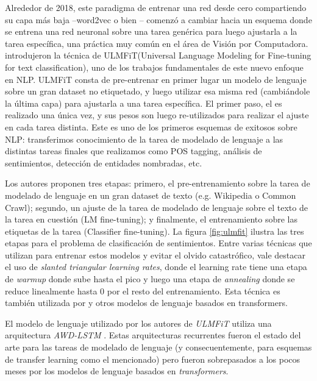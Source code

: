 Alrededor de 2018, este paradigma de entrenar una red desde cero compartiendo su capa más baja --word2vec o bien \elmo{}-- comenzó a cambiar hacia un esquema donde se entrena una red neuronal sobre una tarea genérica para luego ajustarla a la tarea específica, una práctica muy común en el área de Visión por Computadora. \citet{howard-ruder-2018-universal} introdujeron la técnica de ULMFiT(Universal Language Modeling for Fine-tuning for text classification), uno de los trabajos fundamentales de este nuevo enfoque en NLP. ULMFiT consta de pre-entrenar en primer lugar un modelo de lenguaje sobre un gran dataset no etiquetado, y luego utilizar esa misma red (cambiándole la última capa) para ajustarla a una tarea específica. El primer paso, el  es realizado una única vez, y sus pesos son luego re-utilizados para realizar el ajuste en cada tarea distinta. Este es uno de los primeros esquemas de  exitosos sobre NLP: transferimos conocimiento de la tarea de modelado de lenguaje a las distintas tareas finales que realizamos como POS tagging, análisis de sentimientos, detección de entidades nombradas, etc.

Los autores proponen tres etapas: primero, el pre-entrenamiento sobre la tarea de modelado de lenguaje en un gran dataset de texto (e.g. Wikipedia o Common Crawl); segundo, un ajuste de la tarea de modelado de lenguaje sobre el texto de la tarea en cuestión (LM fine-tuning); y finalmente, el entrenamiento sobre las etiquetas de la tarea (Classifier fine-tuning). La figura \ref{fig:ulmfit} ilustra las tres etapas para el problema de clasificación de sentimientos. Entre varias técnicas que utilizan para entrenar estos modelos y evitar el olvido catastrófico, vale destacar el uso de \emph{slanted triangular learning rates}, donde el learning rate tiene una etapa de \emph{warmup} donde sube hasta el pico y luego una etapa de \emph{annealing} donde se reduce linealmente hasta 0 por el resto del entrenamiento. Esta técnica es también utilizada por \bert{} y otros modelos de lenguaje basados en transformers.

El modelo de lenguaje utilizado por los autores de \emph{ULMFiT} utiliza una arquitectura \emph{AWD-LSTM} \cite{merity2018regularizing}. Estas arquitecturas recurrentes fueron el estado del arte para las tareas de modelado de lenguaje (y consecuentemente, para esquemas de transfer learning como el mencionado) pero fueron sobrepasados a los pocos meses por los modelos de lenguaje basados en \emph{transformers}.


